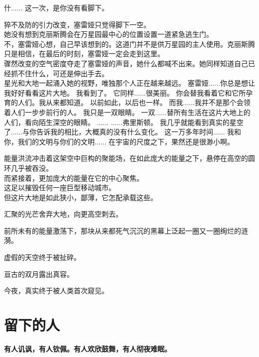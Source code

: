 \documentclass[openany]{book}
\begin{document}
\begin{dialogue}
     什......
     这一次，是你没有看脚下。\par
    猝不及防的引力改变，塞雷娅只觉得脚下一空。\\
    她没有想到克丽斯腾会在万星园最中心的位置设置一道紧急逃生门。\\
    不，塞雷娅心想，自己早该想到的。这道门并不是供万星园的主人使用。克丽斯腾只是相信，在最后的时刻，塞雷娅一定会走到这里。\\
    骤然改变的空气密度夺走了塞雷娅的声音，她什么都喊不出来。她同样知道自己已经抓不住什么，可还是伸出手去。\\
    星光和大地一起涌入她的视野，唯独那个人正在越来越远。
     塞雷娅......你总是想让我好好看看这片大地。
     我看到了。
     它同样......很美丽。
     你会替我看着它和它所孕育的人们。我从来都知道。
     以前如此，以后也一样。
     而我......我并不是那个会领着人们一步步前行的人。
     我只是一双眼睛。
     一双......替所有生活在这片大地上的人们，看向陌生深空的眼睛。
     ......
     ......弗里斯顿。
     我几乎就能看到真实的星空了......与你告诉我的相比，大概真的没有什么变化。
     这一万多年时间......
     我和你，我们的文明与你们的文明......
     在宇宙的尺度之下，果然还是很渺小啊。\par
    能量洪流冲击着这架空中巨构的聚能场，在如此庞大的能量之下，悬停在高空的圆环几乎被吞没。\\
    而紧接着，更加庞大的能量在它的中心聚焦。\\
    这足以摧毁任何一座巨型移动城市。\\
    但这片大地是如此狭小，鄙薄，它怎配承载这些。\par
    汇聚的光芒舍弃大地，向更高空刺去。\par
    前所未有的能量激荡下，那块从来都死气沉沉的黑幕上泛起一圈又一圈绚烂的涟漪。\par
    虚假的天空终于被扯碎。\par
    亘古的双月露出真容。\par
    今夜，真实终于被人类首次窥见。
\end{dialogue}

\chapter{留下的人}
\begin{center} \textbf{有人讥讽，有人钦佩。有人欢欣鼓舞，有人彻夜难眠。}\end{center} \par
\clearpage
\end{document}
